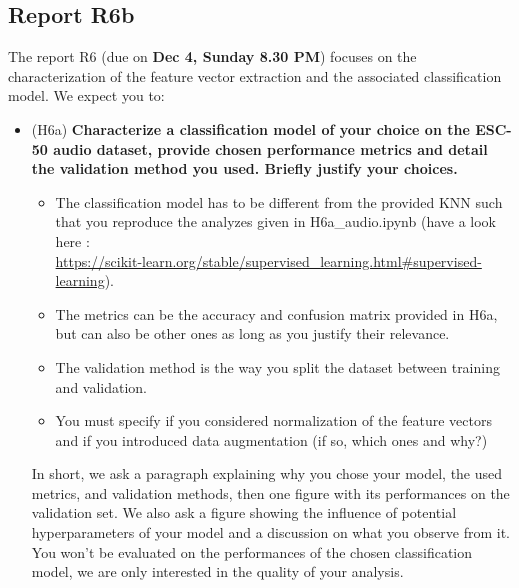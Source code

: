 \begin{itemize}
\section{Report R6b}
%
The report R6 (due on \textbf{Dec 4, Sunday 8.30 PM}) focuses on the characterization of the feature vector extraction and the associated classification model. We expect you to:
%
\begin{itemize}
    \item (H6a) \textbf{Characterize a classification model of your choice on the ESC-50 audio dataset, provide chosen performance metrics and detail the validation method you used. Briefly justify your choices.}
    \begin{itemize}
        \item The classification model has to be different from the provided KNN such that you reproduce the analyzes given in H6a\_audio.ipynb (have a look here :\\ \url{https://scikit-learn.org/stable/supervised\_learning.html#supervised-learning}).
        \item The metrics can be the accuracy and confusion matrix provided in H6a, but can also be other ones as long as you justify their relevance.
        \item The validation method is the way you split the dataset between training and validation.
        \item You must specify if you considered normalization of the feature vectors and if you introduced data augmentation (if so, which ones and why?)
    \end{itemize}
    In short, we ask a paragraph explaining why you chose your model, the used metrics, and validation methods, then one figure with its performances on the validation set. We also ask a figure showing the influence of potential hyperparameters of your model and a discussion on what you observe from it. You won't be evaluated on the performances of the chosen classification model, we are only interested in the quality of your analysis.

\end{itemize}
\end{itemize}

